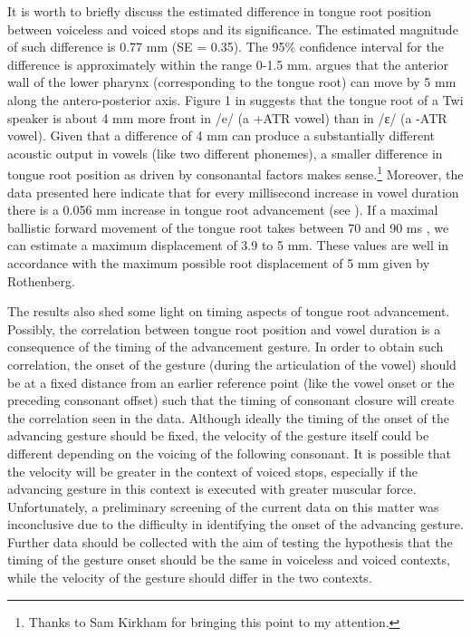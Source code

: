 \documentclass[12pt,]{article}
\let\rmarkdownfootnote\footnote%
\def\footnote{\protect\rmarkdownfootnote}
\begin{document}
It is worth to briefly discuss the estimated difference in tongue root
position between voiceless and voiced stops and its significance. The
estimated magnitude of such difference is 0.77 mm (SE = 0.35). The 95\%
confidence interval for the difference is approximately within the range
0-1.5 mm. \citet{rothenberg1967} argues that the anterior wall of the
lower pharynx (corresponding to the tongue root) can move by 5 mm along
the antero-posterior axis. Figure 1 in \citet{kirkham2017} suggests that
the tongue root of a Twi speaker is about 4 mm more front in /e/ (a +ATR
vowel) than in /ɛ/ (a -ATR vowel). Given that a difference of 4 mm can
produce a substantially different acoustic output in vowels (like two
different phonemes), a smaller difference in tongue root position as
driven by consonantal factors makes
sense.\footnote{Thanks to Sam Kirkham for bringing this point to my attention.}
Moreover, the data presented here indicate that for every millisecond
increase in vowel duration there is a 0.056 mm increase in tongue root
advancement (see ). If a maximal ballistic forward
movement of the tongue root takes between 70 and 90 ms
\citep{rothenberg1967}, we can estimate a maximum displacement of 3.9 to
5 mm. These values are well in accordance with the maximum possible root
displacement of 5 mm given by Rothenberg.

The results also shed some light on timing aspects of tongue root
advancement. Possibly, the correlation between tongue root position and
vowel duration is a consequence of the timing of the advancement
gesture. In order to obtain such correlation, the onset of the gesture
(during the articulation of the vowel) should be at a fixed distance
from an earlier reference point (like the vowel onset or the preceding
consonant offset) such that the timing of consonant closure will create
the correlation seen in the data. Although ideally the timing of the
onset of the advancing gesture should be fixed, the velocity of the
gesture itself could be different depending on the voicing of the
following consonant. It is possible that the velocity will be greater in
the context of voiced stops, especially if the advancing gesture in this
context is executed with greater muscular force. Unfortunately, a
preliminary screening of the current data on this matter was
inconclusive due to the difficulty in identifying the onset of the
advancing gesture. Further data should be collected with the aim of
testing the hypothesis that the timing of the gesture onset should be
the same in voiceless and voiced contexts, while the velocity of the
gesture should differ in the two contexts.
\end{document}
